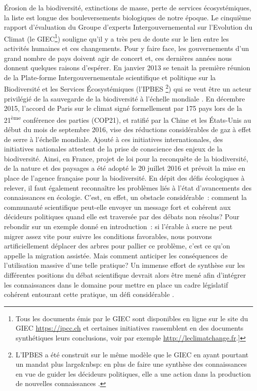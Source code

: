 Érosion de la biodiversité, extinctions de masse, perte de services
écosystémiques, la liste est longue des bouleversements biologiques de
notre époque. Le cinquième rapport d'évaluation du Groupe d'experts
Intergouvernemental sur l'Evolution du Climat (le GIEC\footnote{Tous les
  documents émis par le GIEC sont disponibles en ligne sur le site du
  GIEC \url{https://ipcc.ch} et certaines initiatives rassemblent en des
  documents synthétiques leurs conclusions, voir par exemple
  \url{http://leclimatchange.fr}.{]}}) souligne qu'il y a très peu de
doute sur le lien entre les activités humaines et ces changements. Pour
y faire face, les gouvernements d'un grand nombre de pays doivent agir
de concert et, ces dernières années nous donnent quelques raisons
d'espérer. En janvier 2013 se tenait la première réunion de la
Plate-forme Intergouvernementale scientifique et politique sur la
Biodiversité et les Services Écosystémiques (l'IPBES \footnote{L'IPBES a
  été construit sur le même modèle que le GIEC en ayant pourtant un
  mandat plus large\&nbsp: en plus de faire une synthèse des
  connaissances en vue de guider les décideurs politiques, elle a une
  action dans la production de nouvelles connaissances
  \citep{Brooks2014}.}) qui se veut être un acteur privilégié de la
sauvegarde de la biodiversité à l'échelle mondiale \citep{Diaz2015a}. En
décembre 2015, l'accord de Paris sur le climat signé formellement par
175 pays lors de la 21\textsuperscript{ème} conférence des parties
(COP21), et ratifié par la Chine et les États-Unis au début du mois de
septembre 2016, vise des réductions considérables de gaz à effet de
serre à l'échelle mondiale. Ajouté à ces initiatives internationales,
des initiatives nationales attestent de la prise de conscience des
enjeux de la biodiversité. Ainsi, en France, projet de loi pour la
reconquête de la biodiversité, de la nature et des paysages a été adopté
le 20 juillet 2016 et prévoit la mise en place de l'agence française
pour la biodiversité. En dépit des défis écologiques à relever, il faut
également reconnaître les problèmes liés à l'état d'avancements des
connaissances en écologie. C'est, en effet, un obstacle considérable~:
comment la communauté scientifique peut-elle envoyer un message fort et
cohérent aux décideurs politiques quand elle est traversée par des
débats non résolus? Pour rebondir sur un exemple donné en introduction~:
si l'érable à sucre ne peut migrer assez vite pour suivre les conditions
favorables, nous pouvons artificiellement déplacer des arbres pour
pallier ce problème, c'est ce qu'on appelle la migration assistée. Mais
comment anticiper les conséquences de l'utilisation massive d'une telle
pratique? Un immense effort de synthèse sur les différentes positions du
débat scientifique devrait alors être mené afin d'intégrer les
connaissances dans le domaine pour mettre en place un cadre législatif
cohérent entourant cette pratique, un défi considérable
\citep{McLachlan2007}.


